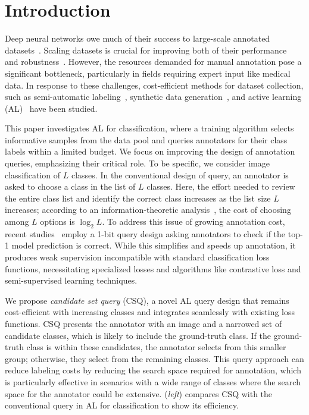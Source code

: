 \section{Introduction}
\label{sec:intro}

Deep neural networks owe much of their success to large-scale annotated datasets~\citep{Imagenet, kirillov2023segment, openai2023gpt4, radford2021learning}.
Scaling datasets is crucial for improving both of their performance~\citep{hestness2017deep, zhai2022scaling} and robustness~\citep{fang2022data}.
However, the resources demanded for manual annotation pose a significant bottleneck, particularly in fields requiring expert input like medical data.
In response to these challenges, cost-efficient methods for dataset collection, such as semi-automatic labeling~\citep{kim2024active,qu2024abdomenatlas,wang2024samrs}, synthetic data generation~\citep{liu2019generative,tran2019bayesian}, and active learning (AL)~\citep{ash2019deep,kirsch2019batchbald,sener2017active,settles2009active,sinha2019variational,wang2015querying} have been studied.

This paper investigates AL for classification, where a training algorithm selects informative samples from the data pool and queries annotators for their class labels within a limited budget.
We focus on improving the design of annotation queries, emphasizing their critical role.
To be specific, we consider image classification of $L$ classes.
In the conventional design of query, an annotator is asked to choose a class
in the list of $L$ classes. Here, the effort needed to review 
the entire class list and identify the correct class increases as the list size $L$ increases; according to an information-theoretic analysis~\citep{hu2020one}, the cost of choosing among $L$ options is $\log_2{L}$.
To address this issue of growing annotation cost, recent studies~\citep{hu2020one,kim2024active} employ a 1-bit query design asking annotators to check if the top-1 model prediction is correct.
While this simplifies and speeds up annotation, it produces weak supervision incompatible with standard classification loss functions, necessitating specialized losses and algorithms like contrastive loss and semi-supervised learning techniques.

We propose \emph{candidate set query} (CSQ), a novel AL query design that remains cost-efficient with increasing classes and integrates seamlessly with existing loss functions.
CSQ presents the annotator with an image and a narrowed set of candidate classes, which is likely to include the ground-truth class.
If the ground-truth class is within these candidates, the annotator selects from this smaller group; otherwise, they select from the remaining classes.
This query approach can reduce labeling costs by reducing the search space required for annotation, which is particularly effective in scenarios with a wide range of classes where the search space for the annotator could be extensive.
(\emph{left}) compares CSQ with the conventional query in AL for classification to show its efficiency. 


